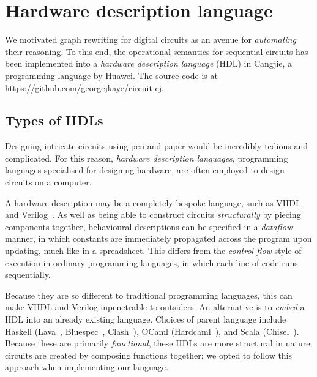 \section{Hardware description language}\label{sec:hdl}

We motivated graph rewriting for digital circuits as an avenue for
\emph{automating} their reasoning.
To this end, the operational semantics for sequential circuits has been
implemented into a \emph{hardware description language} (HDL) in Cangjie, a
programming language by Huawei.
The source code is at \url{https://github.com/georgejkaye/circuit-cj}.

\subsection{Types of HDLs}

Designing intricate circuits using pen and paper would be incredibly tedious and
complicated.
For this reason, \emph{hardware description languages}, programming languages
specialised for designing hardware, are often employed to design circuits on a
computer.

A hardware description may be a completely bespoke language, such as
VHDL~\cite{ieeecomputersociety1988ieee}
and Verilog~\cite{ieeecomputersociety1996ieee}.
As well as being able to construct circuits \emph{structurally} by piecing
components together, behavioural descriptions
can be specified in a \emph{dataflow} manner, in which constants are immediately
propagated across the program upon updating, much like in a spreadsheet.
This differs from the \emph{control flow} style of execution in ordinary
programming languages, in which each line of code runs sequentially.

Because they are so different to traditional programming languages, this can
make VHDL and Verilog inpenetrable to outsiders.
An alternative is to \emph{embed} a HDL into an already existing language.
Choices of parent language include Haskell (Lava~\cite{bjesse1998lava},
Bluespec~\cite{nikhil2004bluespec},
Clash~\cite{kooijman2009haskell,baaij2010clash}), OCaml
(Hardcaml~\cite{ray2023hardcaml}), and Scala (Chisel~\cite{bachrach2012chisel}).
Because these are primarily \emph{functional}, these HDLs are more structural in
nature; circuits are created by composing functions together; we opted to follow
this approach when implementing our language.

